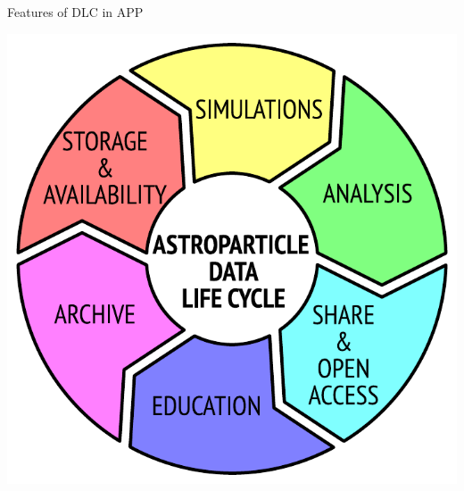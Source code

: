 \begin{frame}{Features of DLC in APP}
\begin{minipage}[c]{0.64\textwidth}
\begin{itemize}
        \end{itemize}
    \end{minipage}
    \hfill
    \begin{minipage}[c]{0.35\textwidth}
        \includegraphics[width=1\textwidth]{pics/ADLC.pdf}
    \end{minipage}
\end{frame}

